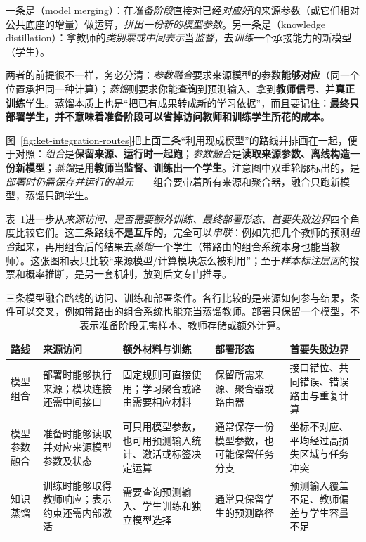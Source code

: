 一条是（model merging）：在\emph{准备阶段}直接对已经\emph{对应好}的来源参数（或它们相对公共底座的增量）做运算，\emph{拼出一份新的模型参数}。另一条是（knowledge distillation）：拿教师的\emph{类别票或中间表示}当\emph{监督}，去\emph{训练}一个承接能力的新模型（学生）。

两者的前提很不一样，务必分清：\emph{参数融合}要求来源模型的参数\textbf{能够对应}（同一个位置承担同一种计算）；\emph{蒸馏}则要求你能\textbf{查询}到预测输入、拿到\textbf{教师信号}、并\textbf{真正训练}学生。蒸馏本质上也是“把已有成果转成新的学习依据”，而且要记住：\textbf{最终只部署学生，并不意味着准备阶段可以省掉访问教师和训练学生所花的成本}。

图~\ref{fig:ket-integration-routes}把上面三条“利用现成模型”的路线并排画在一起，便于对照：\emph{组合}是\textbf{保留来源、运行时一起跑}；\emph{参数融合}是\textbf{读取来源参数、离线构造一份新模型}；\emph{蒸馏}是\textbf{用教师当监督、训练出一个学生}。注意图中双重轮廓标出的，是\emph{部署时仍需保存并运行的单元}——组合要带着所有来源和聚合器，融合只跑新模型，蒸馏只跑学生。

表~\ref{tab:ket-integration-route-choice}进一步从\emph{来源访问、是否需要额外训练、最终部署形态、首要失败边界}四个角度比较它们。这三条路线\textbf{不是互斥的}，完全可以\emph{串联}：例如先把几个教师的预测\emph{组合}起来，再用组合后的结果去\emph{蒸馏}一个学生（带路由的组合系统本身也能当教师）。这张图和表只比较“来源模型/计算模块怎么被利用”；至于\emph{样本标注层面}的投票和概率推断，是另一套机制，放到后文专门推导。

\begin{table}[htbp]
  \centering
  \small
  \begin{tabularx}{\linewidth}{@{}p{22mm}XXXX@{}}
    \toprule
    路线 & 来源访问 & 额外材料与训练 & 部署形态 & 首要失败边界 \\
    \midrule
    模型组合 & 部署时能够执行来源；模块连接还需中间接口 & 固定规则可直接使用；学习聚合或路由需要相应材料 & 保留所需来源、聚合器或路由器 & 接口错位、共同错误、错误路由与重复计算 \\
    模型参数融合 & 准备时能够读取并对应来源模型参数及状态 & 可只用模型参数，也可用预测输入统计、激活或标签决定运算 & 通常保存一份模型参数，也可能保留任务分支 & 坐标不对应、平均经过高损失区域与任务冲突 \\
    知识蒸馏 & 训练时能够取得教师响应；表示约束还需内部激活 & 需要查询预测输入、学生训练和独立模型选择 & 通常只保留学生的预测路径 & 预测输入覆盖不足、教师偏差与学生容量不足 \\
    \bottomrule
  \end{tabularx}
  \caption{三条模型融合路线的访问、训练和部署条件。各行比较的是来源如何参与结果，条件可以交叉，例如带路由的组合系统也能充当蒸馏教师。部署只保留一个模型，不表示准备阶段无需样本、教师存储或额外计算。}
  \label{tab:ket-integration-route-choice}
\end{table}

